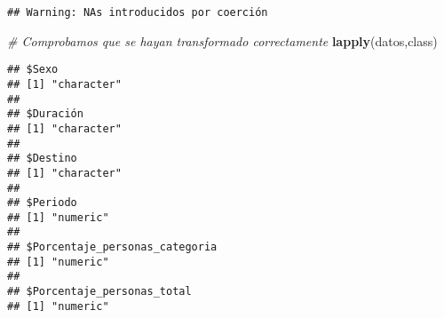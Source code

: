 \documentclass[notspecified,article,submit,moreauthors,pdftex]{Definitions/mdpi}
\newenvironment{Shaded}{\begin{snugshade}}{\end{snugshade}}
\newcommand{\CommentTok}[1]{\textcolor[rgb]{0.56,0.35,0.01}{\textit{#1}}}
\newcommand{\FunctionTok}[1]{\textcolor[rgb]{0.13,0.29,0.53}{\textbf{#1}}}
\newcommand{\NormalTok}[1]{#1}
\begin{document}
\begin{verbatim}
## Warning: NAs introducidos por coerción
\end{verbatim}

\begin{Shaded}
\begin{Highlighting}[]
\CommentTok{\# Comprobamos que se hayan transformado correctamente}
\FunctionTok{lapply}\NormalTok{(datos,class) }
\end{Highlighting}
\end{Shaded}

\begin{verbatim}
## $Sexo
## [1] "character"
## 
## $Duración
## [1] "character"
## 
## $Destino
## [1] "character"
## 
## $Periodo
## [1] "numeric"
## 
## $Porcentaje_personas_categoria
## [1] "numeric"
## 
## $Porcentaje_personas_total
## [1] "numeric"
\end{verbatim}


\vspace{6pt}












\end{document}
